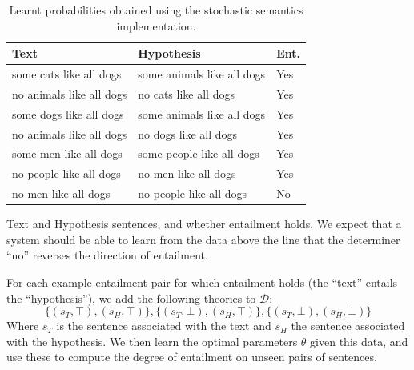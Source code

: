 \documentclass[11pt]{article}
\theoremstyle{definition}
\begin{document}

\begin{table}
  \parbox{.62\linewidth}{
    \begin{center}
      \begin{tabular}{|l|l|l|}
        \hline
        Text & Hypothesis & Ent.\\
        \hline
        some cats like all dogs & some animals like all dogs & Yes\\
        no animals like all dogs & no cats like all dogs & Yes\\
        some dogs like all dogs & some animals like all dogs & Yes\\
        no animals like all dogs & no dogs like all dogs & Yes\\
        some men like all dogs & some people like all dogs & Yes\\
        \hline
        no people like all dogs & no men like all dogs & Yes\\
        no men like all dogs & no people like all dogs & No\\
        \hline
      \end{tabular}
      \caption{Text and Hypothesis sentences, and whether entailment
        holds. We expect that a system should be able to learn from
        the data above the line that the determiner ``no'' reverses the
        direction of entailment.}
      \label{table:mono}
    \end{center}
  }
  \hfill
  \parbox{.32\linewidth}{
    \centering
    \caption{Learnt probabilities obtained using the
      stochastic semantics implementation.}
    \label{table:lexical-sato}
  }
\end{table}


For each example entailment pair for which entailment holds (the
``text'' entails the ``hypothesis''), we add
the following theories to $\mathcal{D}$:
\[
\{(s_T,\top),(s_H,\top)\}, \{(s_T,\bot),(s_H,\top)\},\{(s_T,\bot),(s_H,\bot)\}
\]
Where $s_T$ is the sentence associated with the text and $s_H$ the
sentence associated with the hypothesis. We then learn the optimal
parameters $\theta$ given this data, and use these to compute the
degree of entailment on unseen pairs of sentences.
\end{document}
